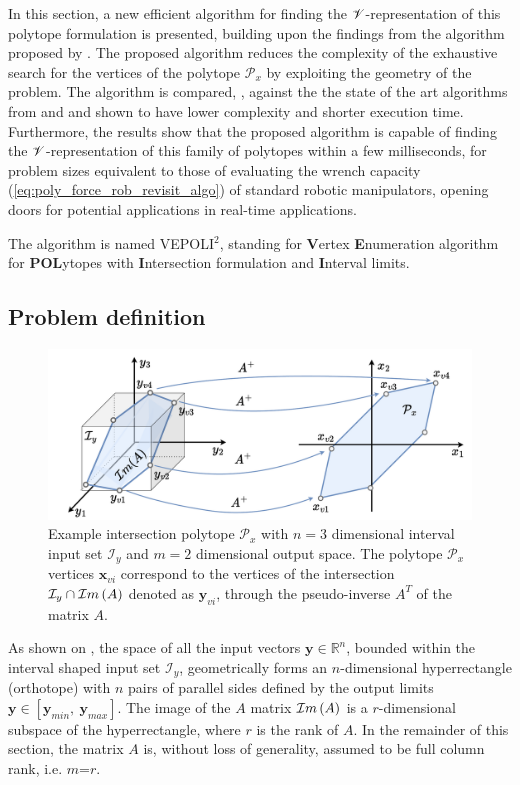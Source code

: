In this section, a new efficient algorithm for finding the $\mathscr{V}$-representation of this polytope formulation is presented, building upon the findings from the algorithm proposed by \citet{sasaki2011vertex}. The proposed algorithm reduces the complexity of the exhaustive search for the vertices of the polytope $\mathcal{P}_x$ by exploiting the geometry of the problem.  The algorithm is compared, , against the the state of the art algorithms from \citet{chiacchio_evaluation_1996} and \citet{sasaki2011vertex} and shown to have lower complexity and shorter execution time. Furthermore, the results show that the proposed algorithm is capable of finding the $\mathscr{V}$-representation of this family of polytopes within a few milliseconds, for problem sizes equivalent to those of evaluating the wrench capacity (\ref{eq:poly_force_rob_revisit_algo}) of standard robotic manipulators, opening doors for potential applications in real-time applications.

The algorithm is named VEPOLI$^2$, standing for \textbf{V}ertex \textbf{E}numeration algorithm for \textbf{POL}ytopes with \textbf{I}ntersection formulation and \textbf{I}nterval limits.


\subsection{Problem definition}

\begin{figure}[!h]
    \centering
    \includegraphics[width=0.8\linewidth]{Papers/images/intersection_algo.pdf}
    \caption{Example intersection polytope $\mathcal{P}_x$ with $n=3$ dimensional interval input set $\mathcal{I}_y$ and $m=2$ dimensional output space. The polytope $\mathcal{P}_x$ vertices $\bm{x}_{vi}$ correspond to the vertices of the intersection $\mathcal{I}_y\cap\mathcal{I}m\left(A\right)$ denoted as $\bm{y}_{vi}$, through the pseudo-inverse $A^T$ of the matrix $A$.}
    \label{fig:intersection_algo}
\end{figure}

As shown on , the space of all the input vectors $\bm{y}\in\mathbb{R}^n$, bounded within the interval shaped input set $\mathcal{I}_y$, geometrically forms an $n$-dimensional hyperrectangle (orthotope) with $n$ pairs of parallel sides defined by the output limits $\bm{y}\in[\bm{y}_{min},~\bm{y}_{max}]$. The image of the $A$ matrix $\mathcal{I}m\left(A\right)$ is a $r$-dimensional subspace of the hyperrectangle, where $r$ is the rank of $A$. In  the remainder of this section, the matrix $A$ is, without loss of generality, assumed to be full column rank, i.e. $m$=$r$. 

